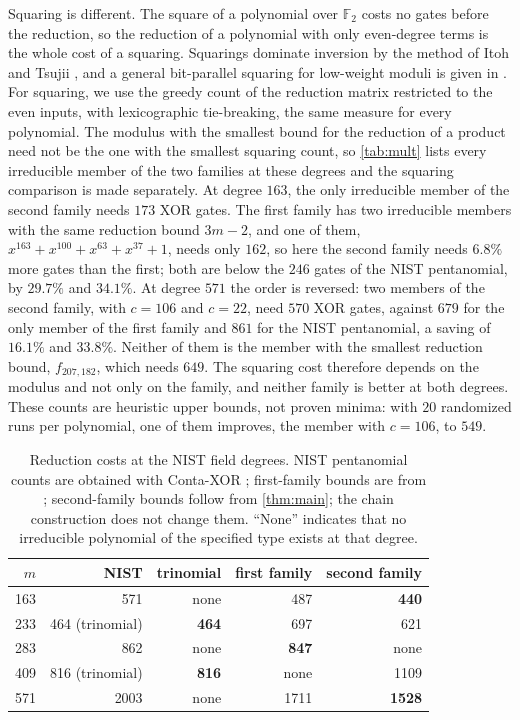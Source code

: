 \documentclass{ieeeaccess}
\theoremstyle{plain}
\theoremstyle{definition}
\newcommand{\F}{\mathbb{F}}
\begin{document}
Squaring is different. The square of a polynomial over $\F_2$ costs no gates
before the reduction, so the reduction of a polynomial with only even-degree
terms is the whole cost of a squaring. Squarings dominate inversion by the
method of Itoh and Tsujii \cite{ItohTsujii1988}, and a general bit-parallel
squaring for low-weight moduli is given in \cite{NiehuesCP2018}. For squaring,
we use the greedy count of the reduction matrix restricted to the even inputs,
with lexicographic tie-breaking, the same measure for every polynomial. The
modulus with the smallest bound for the reduction of a product need not be the
one with the smallest squaring count, so \cref{tab:mult} lists every irreducible
member of the two families at these degrees and the squaring comparison is made
separately. At degree $163$, the only irreducible member of the second family
needs $173$ XOR gates. The first family has two irreducible members with the
same reduction bound $3m-2$, and one of them, $x^{163}+x^{100}+x^{63}+x^{37}+1$,
needs only $162$, so here the second family needs $6.8\%$ more gates than the
first; both are below the $246$ gates of the NIST pentanomial, by $29.7\%$ and
$34.1\%$. At degree $571$ the order is reversed: two members of the second
family, with $c=106$ and $c=22$, need $570$ XOR gates, against $679$ for the
only member of the first family and $861$ for the NIST pentanomial, a saving of
$16.1\%$ and $33.8\%$. Neither of them is the member with the smallest reduction
bound, $f_{207,182}$, which needs $649$. The squaring cost therefore depends on
the modulus and not only on the family, and neither family is better at both
degrees. These counts are heuristic upper bounds, not proven minima: with $20$
randomized runs per polynomial, one of them improves, the member with $c=106$,
to $549$.


\begin{table}[t]
\centering\small
\caption{Reduction costs at the
NIST field degrees.
NIST pentanomial counts
are obtained with Conta-XOR
\cite{Banegas2015};
first-family bounds are
from \cite{BCP2019};
second-family bounds
follow from \cref{thm:main}; the chain construction
does not change them.
``None'' indicates that
no irreducible polynomial
of the specified type
exists at that degree.}
\label{tab:nist}
\setlength{\tabcolsep}{4pt}
\begin{tabular}{@{}r r r r r@{}}
\toprule
$m$ & NIST & trinomial & first family & second family\\
\midrule
163 & 571 & none & 487 & \textbf{440}\\
233 & 464 (trinomial) & \textbf{464} & 697 & 621\\
283 & 862 & none & \textbf{847} & none\\
409 & 816 (trinomial) & \textbf{816} & none & 1109\\
571 & 2003 & none & 1711 & \textbf{1528}\\
\bottomrule
\end{tabular}
\end{table}
\end{document}
